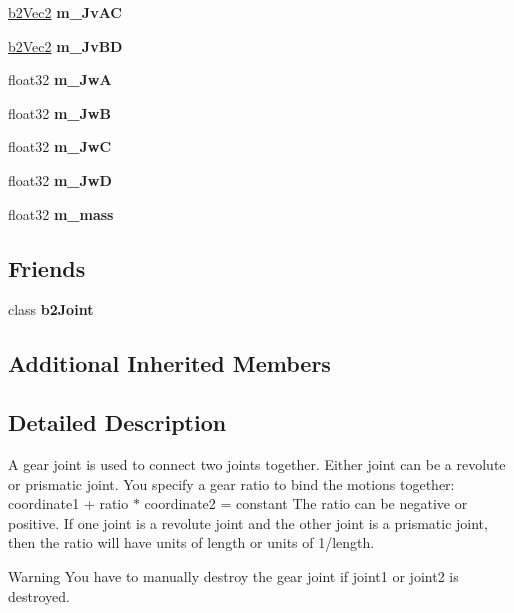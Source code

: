 \begin{DoxyCompactItemize}
\hyperlink{structb2Vec2}{b2\+Vec2} {\bfseries m\+\_\+\+Jv\+AC}
\item 
\mbox{\label{classb2GearJoint_ab00b00c061d8b9e461f76ac4d72aac8c}} 
\hyperlink{structb2Vec2}{b2\+Vec2} {\bfseries m\+\_\+\+Jv\+BD}
\item 
\mbox{\label{classb2GearJoint_a3774fc69538e658f123d9437934aed70}} 
float32 {\bfseries m\+\_\+\+JwA}
\item 
\mbox{\label{classb2GearJoint_afcdb0ebe31ff8039771d006f4b87645c}} 
float32 {\bfseries m\+\_\+\+JwB}
\item 
\mbox{\label{classb2GearJoint_ac9b8f418c8f79392049afdf18aa6dc3e}} 
float32 {\bfseries m\+\_\+\+JwC}
\item 
\mbox{\label{classb2GearJoint_ac2d00521ef5f7c27b1747ad54d4ad5c2}} 
float32 {\bfseries m\+\_\+\+JwD}
\item 
\mbox{\label{classb2GearJoint_a71ac3578918bc97d257d652777b6b87f}} 
float32 {\bfseries m\+\_\+mass}
\end{DoxyCompactItemize}
\subsection*{Friends}
\begin{DoxyCompactItemize}
\item 
\mbox{\label{classb2GearJoint_a2f8aeb7f12b8fbe115431953a4926eed}} 
class {\bfseries b2\+Joint}
\end{DoxyCompactItemize}
\subsection*{Additional Inherited Members}


\subsection{Detailed Description}
A gear joint is used to connect two joints together. Either joint can be a revolute or prismatic joint. You specify a gear ratio to bind the motions together\+: coordinate1 + ratio $\ast$ coordinate2 = constant The ratio can be negative or positive. If one joint is a revolute joint and the other joint is a prismatic joint, then the ratio will have units of length or units of 1/length. \begin{DoxyWarning}{Warning}
You have to manually destroy the gear joint if joint1 or joint2 is destroyed. 
\end{DoxyWarning}


